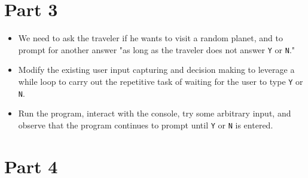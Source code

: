 \documentclass[a4paper,11pt]{scrartcl}
\begin{document}
\section*{Part 3}

\begin{itemize}
\item We need to ask the traveler if he wants to visit a random planet, and to prompt for another answer "as long as the traveler does not answer \texttt{Y} or \texttt{N}."
\item Modify the existing user input capturing and decision making to leverage a while loop to carry out the repetitive task of waiting for the user to type \texttt{Y} or \texttt{N}.
\item Run the program, interact with the console, try some arbitrary input, and observe that the program continues to prompt until \texttt{Y} or \texttt{N} is entered.
\end{itemize}

\section*{Part 4}
\end{document}
